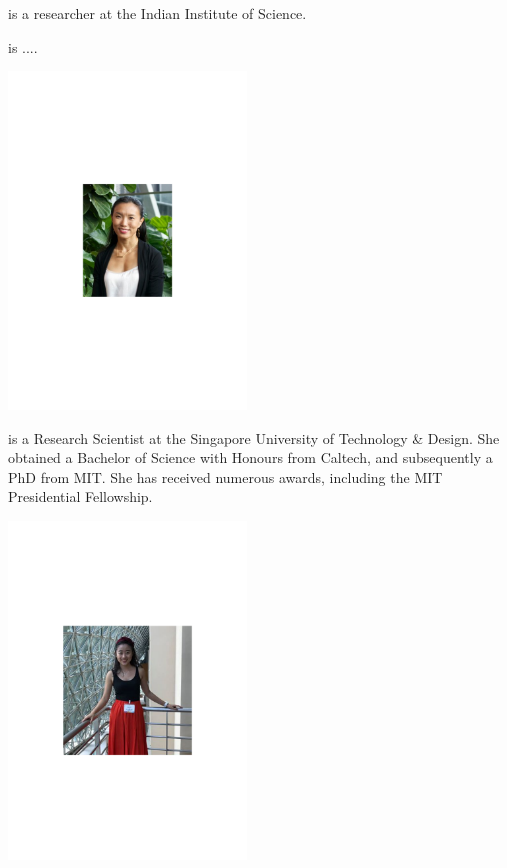  is a researcher at the Indian Institute of Science.


%
%

\begin{center}
\end{center}

 is .... 

%
%

\begin{center}
\includegraphics[clip=true, width=0.475\textwidth]{photo_sihui_tan}
\end{center}

 is a Research Scientist at the Singapore University of Technology \& Design. She obtained a Bachelor of Science with Honours from Caltech, and subsequently a PhD from MIT. She has received numerous awards, including the MIT Presidential Fellowship.


%
%

\begin{center}
\includegraphics[clip=true, width=0.475\textwidth]{photo_nana_liu}
\end{center}

